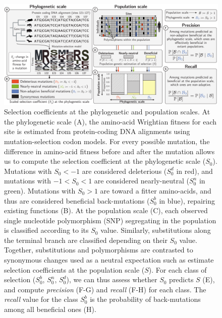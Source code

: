 \documentclass{article}
\newcommand{\Sphy}{S_{0}}
\newcommand{\SphyDel}{\Sphy^{d}}
\newcommand{\SphyNeu}{\Sphy^{n}}
\newcommand{\SphyBen}{\Sphy^{b}}
\newcommand{\Spop}{S}
\begin{document}
    \begin{figure}[!ht]
        \centering
        \includegraphics[width=\textwidth, page=1] {artworks/figure.method.proba}
        \caption{
            Selection coefficients at the phylogenetic and population scales.
            At the phylogenetic scale (A), the amino-acid Wrightian fitness for each site is estimated from protein-coding DNA alignments using mutation-selection codon models.
            For every possible mutation, the difference in amino-acid fitness before and after the mutation allows us to compute the selection coefficient at the phylogenetic scale ($\Sphy$).
            Mutations with $\Sphy < -1$ are considered deleterious ($\SphyDel$ in red), and mutations with $-1 < \Sphy < 1$ are considered nearly-neutral ($\SphyNeu$ in green).
            Mutations with $\Sphy > 1$ are toward a fitter amino-acids, and thus are considered beneficial back-mutations ($\SphyBen$ in blue), repairing existing functions (B).
            At the population scale (C), each observed single nucleotide polymorphism (SNP) segregating in the population is classified according to its $\Sphy$ value.
            Similarly, substitutions along the terminal branch are classified depending on their $\Sphy$ value.
            Together, substitutions and polymorphisms are contrasted to synonymous changes used as a neutral expectation such as estimate selection coefficients at the population scale ($\Spop$).
            For each class of selection ($\SphyBen$, $\SphyNeu$, $\SphyDel$), we can thus assess whether $\Sphy$ predicts $\Spop$ (E), and compute \textit{precision} (F-G) and \textit{recall} (F-H) for each class.
            The \textit{recall} value for the class $\SphyBen$ is the probability of back-mutations among all beneficial ones (H).
        }
        \label{fig:method}
    \end{figure}
\end{document}
